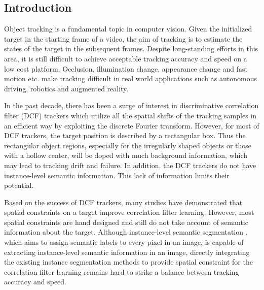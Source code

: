 \documentclass[review]{elsarticle}
\begin{document}
\begin{CJK*}{UTF8}{gbsn}

\section{Introduction}
Object tracking is a fundamental topic in computer vision. Given the initialized target in the starting frame of a video, the aim of tracking is to estimate the states of the target in the subsequent frames. Despite long-standing efforts \cite{Bolme2010VisualOT, Danelljan2014AccurateSE, Henriques2015HighSpeedTW, Li2014ASA, Nam2016LearningMC, Danelljan2015ConvolutionalFF, Wang2018SiamMask} in this area, it is still difficult to achieve acceptable tracking accuracy and speed on a low cost platform. Occlusion, illumination change, appearance change and fast motion etc. make tracking difficult in real world applications such as autonomous driving, robotics and augmented reality.

In the past decade, there has been a surge of interest in discriminative correlation filter (DCF) trackers \cite{Bolme2010VisualOT, Danelljan2014AccurateSE, Henriques2015HighSpeedTW, Li2014ASA} which utilize all the spatial shifts of the tracking samples in an efficient way by exploiting the discrete Fourier transform. However, for most of DCF trackers, the target position is described by a rectangular box. Thus the rectangular object regions, especially for the irregularly shaped objects or those with a hollow center, will be doped with much background information, which may lead to tracking drift and failure. In addition, the DCF trackers do not have instance-level semantic information. This lack of information limits their potential.

Based on the success of DCF trackers, many studies \cite{Danelljan2015LearningSR, Lukezic2017DiscriminativeCF, Galoogahi2017LearningBC, Xu2018LearningAD, Feng2018LearningSR} have demonstrated that spatial constraints on a target improve correlation filter learning. However, most spatial constraints are hand designed and still do not take account of semantic information about the target. Although instance-level semantic segmentation \cite{Pinheiro2015LearningTS}, which aims to assign semantic labels to every pixel in an image, is capable of extracting instance-level semantic information in an image, directly integrating the existing instance segmentation methods to provide spatial constraint for the correlation filter learning remains hard to strike a balance between tracking accuracy and speed.


\end{CJK*}
\end{document}
